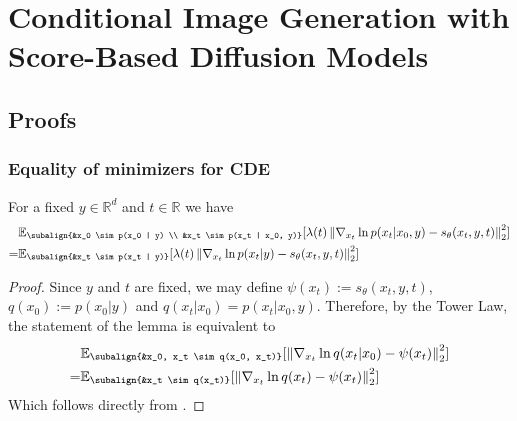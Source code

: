 
\chapter{Conditional Image Generation with Score-Based Diffusion Models}  %
\section{Proofs}
\label{appendix:proofs}
\subsection{Equality of minimizers for CDE}
\label{appendix:minimizers}
\begin{lemma}
    \label{Vincent}
    For a fixed $y \in \mathbb{R}^d$ and $t \in \mathbb{R}$ we have
    \begin{align*}
        &\mathbb{E}_{\subalign{&x_0 \sim p(x_0 | y) \\ &x_t \sim p(x_t | x_0, y)}} 
            [\lambda(t) \norm{\nabla_{x_t} \ln{p(x_t | x_0, y)} - s_\theta(x_t, y, t)}_2^2]\\
        =& \mathbb{E}_{\subalign{&x_t \sim p(x_t |  y)}} 
            [\lambda(t) \norm{\nabla_{x_t} \ln{p(x_t | y)} - s_\theta(x_t, y, t)}_2^2]
    \end{align*}
\begin{proof}
    Since $y$ and $t$ are fixed, we may define $\psi(x_t) := s_\theta(x_t, y, t)$, $q(x_0) := p(x_0 | y)$ and $q(x_t | x_0) = p(x_t | x_0, y)$.
    Therefore, by the Tower Law, the statement of the lemma is equivalent to
    \begin{align*}
        &\mathbb{E}_{\subalign{&x_0, x_t \sim q(x_0, x_t)}} 
        [\norm{\nabla_{x_t} \ln{q(x_t | x_0)} - \psi(x_t)}_2^2]\\
    =& \mathbb{E}_{\subalign{&x_t \sim q(x_t)}} 
        [\norm{\nabla_{x_t} \ln{q(x_t)} - \psi(x_t)}_2^2]
    \end{align*}
    Which follows directly from \cite[Eq. 11]{vincent2011connection}.
\end{proof}
    
\end{lemma}
